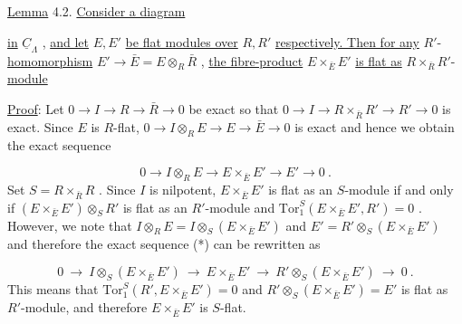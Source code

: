 \underline{Lemma} 4.2.  \underline{Consider a diagram}

\begin{center}
\end{center}
\underline{in}  $\underline{C}_\Lambda$ , \underline{and let}  $E, E'$  \underline{be flat modules over}  $R, R'$  \underline{respectively. Then for any} $R'$-\underline{homomorphism}  $E' \to \bar{E} = E \otimes_R \bar{R}$ , \underline{the fibre-product}  $E \times_{\bar{E}} E'$  \underline{is flat as} $R \times_{\bar{R}} R'$-\underline{module}



\underline{Proof}:  Let  $0 \to I \to R \to \bar{R} \to 0$  be exact so that  $0 \to I \to R \times_{\bar{R}} R' \to R' \to 0$  is exact. Since  $E$  is $R$-flat,  $0 \to I \otimes_R E \to E \to \bar{E} \to 0$  is exact and hence we obtain the exact sequence

\begin{equation}\tag{*}
0 \to I \otimes_R E \to E \times_{\bar{E}} E' \to E' \to 0 \ .
\end{equation}
Set  $S = R \times_{\bar{R}} R$ . Since  $I$  is nilpotent,  $E \times_{\bar{E}} E'$  is flat as an $S$-module if and only if  $(E \times_{\bar{E}} E') \otimes_S R'$  is flat as an $R'$-module and  $\mathrm{Tor}_1^S (E \times_{\bar{E}} E', R') = 0$ . However, we note that  $I \otimes_R E = I \otimes_S (E \times_{\bar{E}} E')$  and  $E' = R' \otimes_S (E \times_{\bar{E}} E')$  and therefore the exact sequence (*) can be rewritten as

\begin{equation*}
0 \ \to \ I \otimes_S (E \times_{\bar{E}} E') \ \to \ E \times_{\bar{E}} E' \ \to \ R' \otimes_S (E \times_{\bar{E}} E') \ \to \ 0 \ .
\end{equation*}
This means that  $\mathrm{Tor}_1^S (R', E \times_{\bar{E}} E') = 0$  and  $R' \otimes_S (E \times_{\bar{E}} E') = E'$  is flat as $R'$-module, and therefore  $E \times_{\bar{E}} E'$  is $S$-flat.

